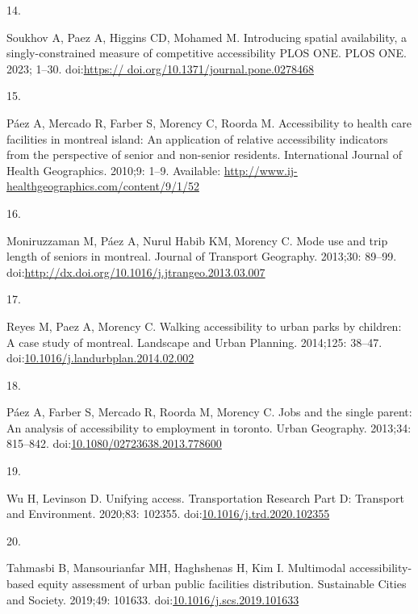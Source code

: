 \documentclass[10pt,letterpaper]{article}
\newlength{\cslhangindent}
\newlength{\csllabelwidth}
\newlength{\cslentryspacingunit} %
\newenvironment{CSLReferences}[2] %
 {%
  \setlength{\parindent}{0pt}
  \ifodd #1
  \let\oldpar\par
  \def\par{\hangindent=\cslhangindent\oldpar}
  \fi
  \setlength{\parskip}{#2\cslentryspacingunit}
 }%
 {}
\newcommand{\CSLLeftMargin}[1]{\parbox[t]{\csllabelwidth}{#1}}
\newcommand{\CSLRightInline}[1]{\parbox[t]{\linewidth - \csllabelwidth}{#1}\break}
\begin{document}
\begin{CSLReferences}{0}{0}
\leavevmode{}%
\CSLLeftMargin{14. }%
\CSLRightInline{Soukhov A, Paez A, Higgins CD, Mohamed M. Introducing
spatial availability, a singly-constrained measure of competitive
accessibility {\textbar} {PLOS} {ONE}. {PLOS} {ONE}. 2023; 1--30.
doi:\href{https://\%20doi.org/10.1371/journal.pone.0278468}{https://
doi.org/10.1371/journal.pone.0278468}}

\leavevmode{}%
\CSLLeftMargin{15. }%
\CSLRightInline{Páez A, Mercado R, Farber S, Morency C, Roorda M.
Accessibility to health care facilities in montreal island: An
application of relative accessibility indicators from the perspective of
senior and non-senior residents. International Journal of Health
Geographics. 2010;9: 1--9. Available:
\url{http://www.ij-healthgeographics.com/content/9/1/52}}

\leavevmode{}%
\CSLLeftMargin{16. }%
\CSLRightInline{Moniruzzaman M, Páez A, Nurul Habib KM, Morency C. Mode
use and trip length of seniors in montreal. Journal of Transport
Geography. 2013;30: 89--99.
doi:\url{http://dx.doi.org/10.1016/j.jtrangeo.2013.03.007}}

\leavevmode{}%
\CSLLeftMargin{17. }%
\CSLRightInline{Reyes M, Paez A, Morency C. Walking accessibility to
urban parks by children: A case study of montreal. Landscape and Urban
Planning. 2014;125: 38--47.
doi:\href{https://doi.org/10.1016/j.landurbplan.2014.02.002}{10.1016/j.landurbplan.2014.02.002}}

\leavevmode{}%
\CSLLeftMargin{18. }%
\CSLRightInline{Páez A, Farber S, Mercado R, Roorda M, Morency C. Jobs
and the single parent: An analysis of accessibility to employment in
toronto. Urban Geography. 2013;34: 815--842.
doi:\href{https://doi.org/10.1080/02723638.2013.778600}{10.1080/02723638.2013.778600}}

\leavevmode{}%
\CSLLeftMargin{19. }%
\CSLRightInline{Wu H, Levinson D. Unifying access. Transportation
Research Part D: Transport and Environment. 2020;83: 102355.
doi:\href{https://doi.org/10.1016/j.trd.2020.102355}{10.1016/j.trd.2020.102355}}

\leavevmode{}%
\CSLLeftMargin{20. }%
\CSLRightInline{Tahmasbi B, Mansourianfar MH, Haghshenas H, Kim I.
Multimodal accessibility-based equity assessment of urban public
facilities distribution. Sustainable Cities and Society. 2019;49:
101633.
doi:\href{https://doi.org/10.1016/j.scs.2019.101633}{10.1016/j.scs.2019.101633}}


\end{CSLReferences}
\end{document}
